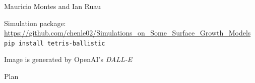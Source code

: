 \documentclass[9pt,table,xcolor=dvipsnames]{beamer}
\begin{document}
\begin{frame}[fragile]
\begin{center}
    Mauricio Montes and Ian Ruau

    \vfill
    {\footnotesize Simulation package: \\[0.5em]
    \url{https://github.com/chenle02/Simulations_on_Some_Surface_Growth_Models}\\[0.5em]
    \texttt{pip install tetris-ballistic}}
  \end{center}
\end{frame}
\begin{frame}[fragile,t] %
  \begin{center}
    \bigskip

    \small Image is generated by OpenAI's \textit{DALL-E}

  \end{center}
\end{frame}
\begin{frame}{Plan} %
 \tableofcontents
\end{frame}
\end{document}
